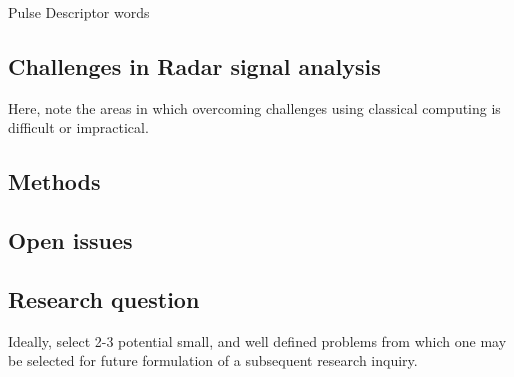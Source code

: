 Pulse Descriptor words \cite{kg_pulse_nodate}


\subsection{Challenges in Radar signal analysis}

Here, note the areas in which overcoming challenges using classical computing is difficult or impractical.

\subsection{Methods}

\subsection{Open issues}

\subsection{Research question}

Ideally, select 2-3 potential small, and well defined problems from which one may be selected for future formulation of a subsequent research inquiry.

